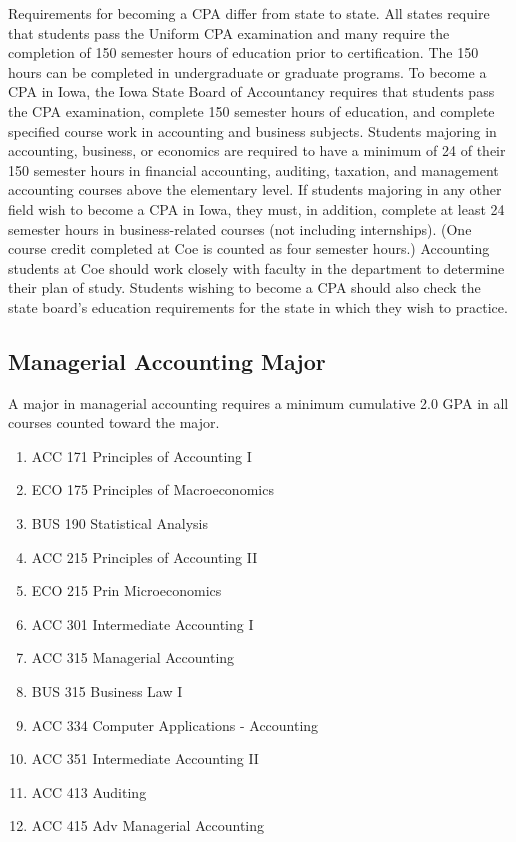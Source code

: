 \documentclass[
  letterpaper,
]{scrbook}
\providecommand{\tightlist}{%
  \setlength{\itemsep}{0pt}\setlength{\parskip}{0pt}}
\begin{document}
Requirements for becoming a CPA differ from state to state. All states
require that students pass the Uniform CPA examination and many require
the completion of 150 semester hours of education prior to
certification. The 150 hours can be completed in undergraduate or
graduate programs. To become a CPA in Iowa, the Iowa State Board of
Accountancy requires that students pass the CPA examination, complete
150 semester hours of education, and complete specified course work in
accounting and business subjects. Students majoring in accounting,
business, or economics are required to have a minimum of 24 of their 150
semester hours in financial accounting, auditing, taxation, and
management accounting courses above the elementary level. If students
majoring in any other field wish to become a CPA in Iowa, they must, in
addition, complete at least 24 semester hours in business-related
courses (not including internships). (One course credit completed at Coe
is counted as four semester hours.) Accounting students at Coe should
work closely with faculty in the department to determine their plan of
study. Students wishing to become a CPA should also check the state
board's education requirements for the state in which they wish to
practice.

\subsection{Managerial Accounting
Major}\label{managerial-accounting-major}

A major in managerial accounting requires a minimum cumulative 2.0 GPA
in all courses counted toward the major.

\begin{enumerate}
\def\labelenumi{\arabic{enumi}.}
\tightlist
\item
  ACC 171 Principles of Accounting I
\item
  ECO 175 Principles of Macroeconomics
\item
  BUS 190 Statistical Analysis
\item
  ACC 215 Principles of Accounting II
\item
  ECO 215 Prin Microeconomics
\item
  ACC 301 Intermediate Accounting I
\item
  ACC 315 Managerial Accounting
\item
  BUS 315 Business Law I
\item
  ACC 334 Computer Applications - Accounting
\item
  ACC 351 Intermediate Accounting II
\item
  ACC 413 Auditing
\item
  ACC 415 Adv Managerial Accounting
\end{enumerate}
\end{document}
